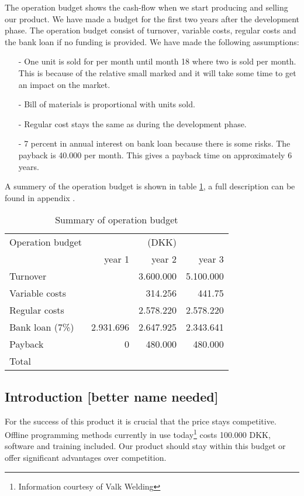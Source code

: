 The operation budget shows the cash-flow when we start producing and selling our product. We have made a budget for the first two years after the development phase. The operation budget consist of turnover, variable costs, regular costs and the bank loan if no funding is provided. We have made the following assumptions:
\begin{itemize}
\item[-] One unit is sold for per month until month 18 where two is sold per month. This is because of the relative small marked and it will take some time to get an impact on the market.
\item[-] Bill of materials is proportional with units sold.
\item[-] Regular cost stays the same as during the development phase.
\item[-] 7 percent in annual interest on bank loan because there is some risks. The payback is 40.000 per month. This gives a payback time on approximately 6 years.
\end{itemize}
A summery of the operation budget is shown in table \ref{opebud}, a full description can be found in appendix .
\begin{table}[h!]
\label{opebud}
\centering
\begin{tabular}{l r r r}
Operation budget						& 				&\hfill(DKK)\\
						&	year 1		& year 2		& year 3 \\
\hline
Turnover				&				& 3.600.000		& 5.100.000 \\
Variable costs	  		&				& 314.256		& 441.75 \\
Regular costs			&			  	& 2.578.220 	& 2.578.220	 \\
Bank loan (7\%)			& 2.931.696 	& 2.647.925 	& 2.343.641\\
Payback					&			0	&	480.000		& 480.000\\
\hline
Total         							&   			&\\
\end{tabular}
\caption{Summary of operation budget}
\end{table}

\subsection{Introduction [better name needed]}
For the success of this product it is crucial that the price stays competitive. Offline programming methods currently in use today\footnote{Information courtesy of Valk Welding} costs 100.000 DKK, software and training included. Our product should stay within this budget or offer significant advantages over competition.
